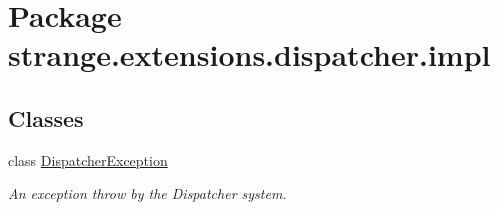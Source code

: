 \hypertarget{namespacestrange_1_1extensions_1_1dispatcher_1_1impl}{\section{Package strange.\-extensions.\-dispatcher.\-impl}
\label{namespacestrange_1_1extensions_1_1dispatcher_1_1impl}
}
\subsection*{Classes}
\begin{DoxyCompactItemize}
\item 
class \hyperlink{classstrange_1_1extensions_1_1dispatcher_1_1impl_1_1_dispatcher_exception}{Dispatcher\-Exception}
\begin{DoxyCompactList}\small\item\em An exception throw by the Dispatcher system. \end{DoxyCompactList}\end{DoxyCompactItemize}
